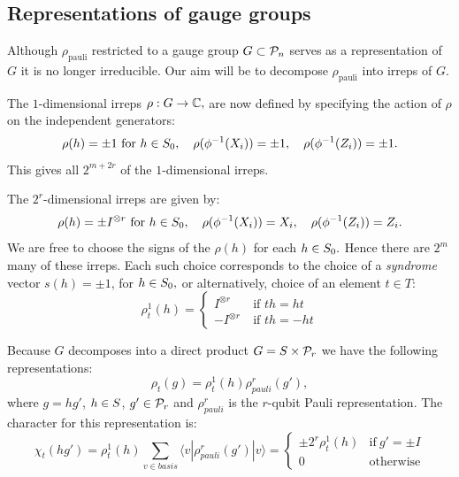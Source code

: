 \subsection{Representations of gauge groups}

Although $\rho_{\mathrm{pauli}}$
restricted to a gauge group $G\subset\mathcal{P}_n$ serves as a representation
of $G$ it is no longer irreducible.
Our aim will be to decompose $\rho_{\mathrm{pauli}}$ into irreps of $G.$

The $1$-dimensional irreps $\rho:G\to \mathbb{C},$
are now defined by
specifying the action of $\rho$ on the independent generators:
$$
    \rho(h)=\pm 1\ \mbox{for}\ h\in S_0,
    \quad \rho(\phi^{-1}(X_i)) = \pm 1,\quad \rho(\phi^{-1}(Z_i)) = \pm 1.
$$
This gives all $2^{m+2r}$ of the $1$-dimensional irreps.

The $2^r$-dimensional irreps are given by:
$$
    \rho(h) = \pm I^{\otimes r}\ \mbox{for}\ h\in S_0,
    \quad \rho(\phi^{-1}(X_i)) = X_i,\quad \rho(\phi^{-1}(Z_i)) = Z_i.
$$
We are free to choose the signs of the $\rho(h)$ for each $h\in S_0.$
Hence there are $2^m$ many of these irreps.
Each such choice corresponds to the choice of a {\it syndrome} vector $s(h)=\pm 1$, for $h \in S_0,$
or alternatively, choice of an element $t\in T:$
$$
    \rho^1_t(h) = \left\{ \begin{array}{ll}
 I^{\otimes r}\ &\mbox{if $th=ht$}\\
 -I^{\otimes r}\ &\mbox{if $th=-ht$}\end{array} \right. %
$$


Because $G$ decomposes 
into a direct product $G=S\times \mathcal{P}_r$ we have the
following representations:
$$
    \rho_t(g) = \rho^1_t(h) \rho^r_{pauli}(g'),
$$
where $g=hg'$, $h\in S$, $g'\in \mathcal{P}_r$ 
and $\rho^r_{pauli}$ is the $r$-qubit Pauli representation.
The character for this representation is:
$$
\chi_{t}(hg') = \rho_t^1(h) \sum_{v \in basis} \langle v | \rho^r_{{pauli}}(g') | v \rangle
    = \left\{ \begin{array}{ll}
 \pm 2^r\rho_t^1(h) &\mbox{if}\ g'=\pm I\\
 0 &\mbox{otherwise}\end{array}\right.
$$

